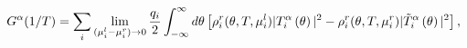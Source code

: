 \begin{equation}
G^{\mathbf{\alpha }}(1/T)=\sum_{i}\lim_{(\mu _{i}^{l}-\mu _{i}^{r})\rightarrow
0}\frac{q_{i}}{2}\int\nolimits_{-\infty }^{\infty }d\theta \left[ \rho
_{i}^{r}(\theta ,T,\mu _{i}^{l})|T_{i}^{\mathbf{\alpha }}\left( \theta
\right) |^{2}-\rho _{i}^{r}(\theta ,T,\mu _{i}^{r})|\tilde{T}_{i}^{\mathbf{%
\alpha }}\left( \theta \right) |^{2}\right] ,  \label{11}
\end{equation}%
